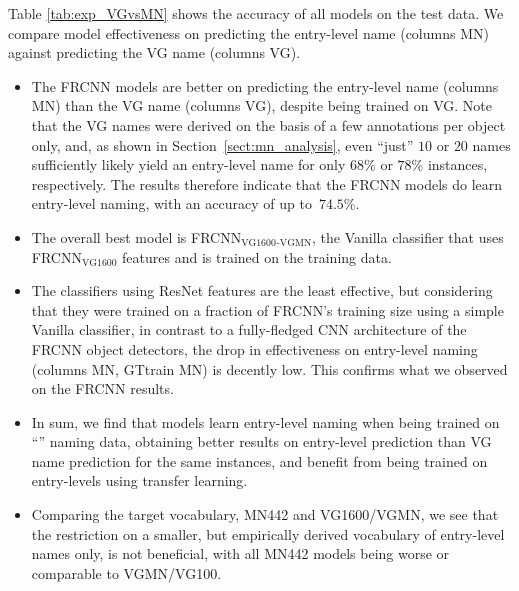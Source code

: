 Table \ref{tab:exp_VGvsMN} shows the accuracy of all models on the \mn test data. 
We compare model effectiveness on predicting the entry-level name (columns MN) against predicting the VG name (columns VG). 

\begin{itemize}
	\item The FRCNN models are better on predicting the entry-level name (columns MN) than the VG name (columns VG), despite being trained on VG.  
	Note that the VG names were derived on the basis of a few annotations per object only, and, as shown in Section~\ref{sect:mn_analysis}, even ``just'' $10$ or $20$ names sufficiently likely yield an entry-level name for only $68\%$ or $78\%$ instances, respectively. 
	The results therefore indicate that the FRCNN models do learn entry-level naming, with an accuracy of up to~$74.5$\%.
	\item The overall best model is FRCNN$_\text{VG1600}$$_\text{-VGMN}$, the Vanilla classifier that uses  FRCNN$_\text{VG1600}$ features and is trained on the \mn training data. 
	\item The classifiers using ResNet features are the least effective, but considering that they were trained on a fraction of FRCNN's training size using a simple Vanilla classifier, in contrast to a fully-fledged CNN architecture of the FRCNN object detectors, the drop in effectiveness on entry-level naming (columns MN, GTtrain MN) is decently low.
	This confirms what we observed on the FRCNN results. 
	\item In sum, we find that models learn entry-level naming when being trained on ``\arbitrary'' naming data, obtaining better results on entry-level prediction than VG name prediction for the same instances, and benefit from being trained on entry-levels using transfer learning. 
	\item Comparing the target vocabulary, MN442 and VG1600/VGMN, we see that the restriction on a smaller, but empirically derived vocabulary of entry-level names only, is not beneficial, with all MN442 models being worse or comparable to VGMN/VG100.
\end{itemize}


